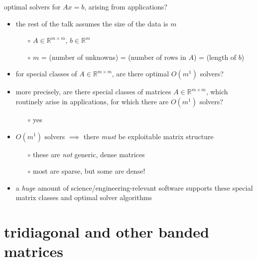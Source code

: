 \documentclass[10pt,
               svgnames,
               hyperref={colorlinks,citecolor=DeepPink4,linkcolor=FireBrick,urlcolor=Maroon},
               usepdftitle=false]{beamer}
\newcommand{\RR}{\mathbb{R}}
\begin{document}
\begin{frame}{optimal solvers for $Ax=b$, arising from applications?}

\begin{itemize}
\item \alert{the rest of the talk assumes the size of the data is $m$}
   \begin{itemize}
   \item[$\circ$] $A\in\RR^{m\times m}$, $b \in \RR^m$
   \item[$\circ$] $m$ = (number of unknowns) = (number of rows in $A$) = (length of $b$)
   \end{itemize}
\item for special classes of $A\in\RR^{m\times m}$, are there optimal $O(m^1)$ solvers?
\item more precisely, are there special classes of matrices $A\in\RR^{m\times m}$, which routinely arise in applications, for which there are $O(m^1)$ solvers?
   \begin{itemize}
   \item[$\circ$] yes
   \end{itemize}
\item $O(m^1)$ solvers $\implies$ there \emph{must} be exploitable matrix structure
   \begin{itemize}
   \item[$\circ$] these are \emph{not} generic, dense matrices
   \item[$\circ$] most are sparse, but some are dense!
   \end{itemize}
\item a \emph{huge} amount of science/engineering-relevant software supports these special matrix classes and optimal solver algorithms
\end{itemize}
\end{frame}


\section{tridiagonal and other banded matrices}
\end{document}
